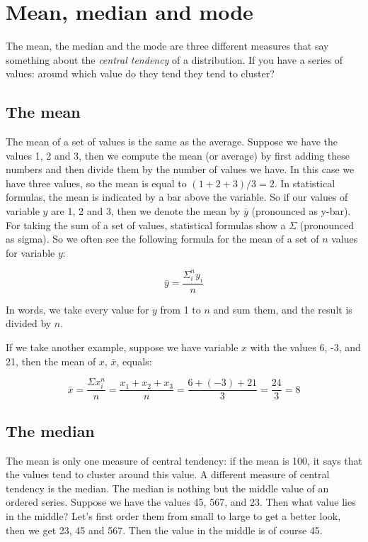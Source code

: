 \documentclass[]{report}\usepackage[]{graphicx}\usepackage[]{color}
\begin{document}
\section{Mean, median and mode}

The mean, the median and the mode are three different measures that say something about the \textit{central tendency} of a distribution. If you have a series of values: around which value do they tend they tend to cluster?

\subsection{The mean}
The mean of a set of values is the same as the average. Suppose we have the values 1, 2 and 3, then we compute the mean (or average) by first adding these numbers and then divide them by the number of values we have. In this case we have three values, so the mean is equal to $(1 + 2 + 3)/3 = 2$. In statistical formulas, the mean is indicated by a bar above the variable. So if our values of variable $y$ are 1, 2 and 3, then we denote the mean by $\bar{y}$ (pronounced as y-bar). For taking the sum of a set of values, statistical formulas show a $\Sigma$ (pronounced as sigma). So we often see the following formula for the mean of a set of $n$ values for variable $y$:

\begin{equation}
\bar{y} = \frac{\Sigma_i^n y_i}{n}
\end{equation}

In words, we take every value for $y$ from 1 to $n$ and sum them, and the result is divided by $n$.

If we take another example, suppose we have variable $x$ with the values {6, -3, and 21}, then the mean of $x$, $\bar{x}$, equals:

\begin{equation}
\bar{x} = \frac {  \Sigma x_i^n} {n} =    \frac{x_1 + x_2 + x_3}{n} = \frac{6 + (-3) + 21}{3} = \frac{24}{3} = 8
\end{equation}







\subsection{The median}
The mean is only one measure of central tendency: if the mean is 100, it says that the values tend to cluster around this value. A different measure of central tendency is the median. The median is nothing but the middle value of an ordered series. Suppose we have the values 45, 567, and 23. Then what value lies in the middle? Let's first order them from small to large to get a better look, then we get 23, 45 and 567. Then the value in the middle is of course 45.
\end{document}
